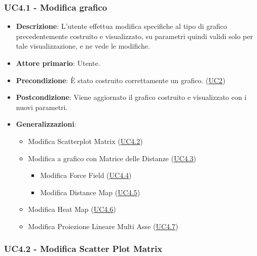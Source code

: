 \newpage
\subsubsection{UC4.1 - Modifica grafico}
\label{ssub:uc4.1}

\begin{itemize}
    \item \textbf{Descrizione}: L’utente effettua modifica specifiche al tipo di grafico precedentemente costruito e visualizzato,
                                su parametri quindi validi solo per tale visualizzazione, e ne vede le modifiche.

    \item \textbf{Attore primario}: Utente.

    \item \textbf{Precondizione}:   È stato costruito correttamente un grafico. (\hyperref[sub:uc2]{UC2})

    \item \textbf{Postcondizione}:  Viene aggiornato il grafico costruito e visualizzato con i nuovi parametri.

    \item \textbf{Generalizzazioni}:
        \begin{itemize}
            \item Modifica Scatterplot Matrix (\hyperref[ssub:uc4.2]{UC4.2})
            \item Modifica a grafico con Matrice delle Distanze (\hyperref[ssub:uc4.3]{UC4.3})
            \begin{itemize}
                \item Modifica Force Field (\hyperref[ssub:uc4.4]{UC4.4})
                \item Modifica Distance Map (\hyperref[ssub:uc4.5]{UC4.5})
             \end{itemize}
            \item Modifica Heat Map (\hyperref[ssub:uc4.6]{UC4.6})
            \item Modifica Proiezione Lineare Multi Asse (\hyperref[ssub:uc4.7]{UC4.7})
        \end{itemize}
\end{itemize}

\subsubsection{UC4.2 - Modifica Scatter Plot Matrix}
\label{ssub:uc4.2}

